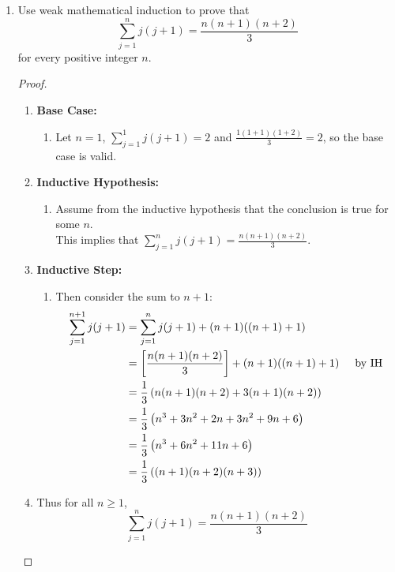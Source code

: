 \documentclass{article}
\def\inlinesum#1#2{\overset{#2}{\underset{#1}{\sum}}}
\begin{document}
\begin{enumerate}
\item
  Use weak mathematical induction to prove that
  $$\inlinesum{j=1}{n}j(j+1)=\frac{n(n+1)(n+2)}3$$
  for every positive integer $n$.
  \begin{proof}
    $ $
    \begin{enumerate}
      \item[] \textbf{Base Case:}
        \begin{enumerate}
          \item[] Let $n=1$, $\sum_{j=1}^{1} j(j+1) = 2$ and $\frac{1(1+1)(1+2)}{3} = 2$, so the
          base case is valid.
        \end{enumerate}
      \item[] \textbf{Inductive Hypothesis:}
        \begin{enumerate}
          \item[] Assume from the inductive hypothesis that the conclusion is true for some $n$.\\
          This implies that $\sum_{j=1}^{n} j(j+1) = \frac{n(n+1)(n+2)}{3}$.
        \end{enumerate}
      \item[] \textbf{Inductive Step:}
        \begin{enumerate}
          \item[] Then consider the sum to $n+1$:
          \begin{align*}
            \sum_{j=1}^{n+1}j(j+1) &= \sum_{j=1}^{n}j(j+1) + (n+1)((n+1)+1) \\
            &= \left[\frac{n(n+1)(n+2)}{3}\right] + (n+1)((n+1)+1) \hspace{5mm}\text{by IH} \\
            &= \frac{1}{3}\left(n(n+1)(n+2) + 3(n+1)(n+2)\right) \\
            &= \frac{1}{3}\left(n^3 + 3n^2 + 2n + 3n^2 + 9n + 6\right) \\
            &= \frac{1}{3}\left(n^3 + 6n^2 + 11n + 6\right) \\
            &= \frac{1}{3}\left((n+1)(n+2)(n+3)\right)
          \end{align*}  
        \end{enumerate}
      \item[] Thus for all $n\geq 1$, $$\sum_{j=1}^{n} j(j+1) = \frac{n(n+1)(n+2)}{3}$$     
    \end{enumerate}
  \end{proof}
  \pagebreak


\end{enumerate}
\end{document}
